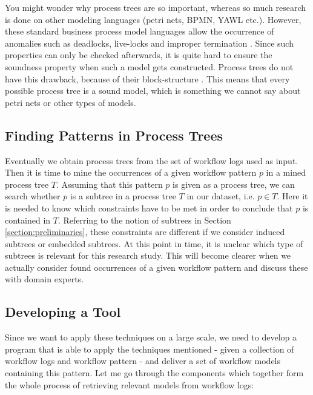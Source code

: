 \documentclass[a4paper,11pt]{article}
\begin{document}
You might wonder why process trees are so important, whereas so much research \cite{VanderAalst2003Survey} is done on other modeling languages (petri nets, BPMN, YAWL etc.). However, these standard business process model languages allow the occurrence of anomalies such as deadlocks, live-locks and improper termination \cite{Buijs2012ProcessTrees}. Since such properties can only be checked afterwards, it is quite hard to ensure the soundness property when such a model gets constructed. Process trees do not have this drawback, because of their block-structure \cite{2009DifferenceBetweenGraphAndBlockStructuredLanguages}. This means that every possible process tree is a sound model, which is something we cannot say about petri nets or other types of models.

\subsection{Finding Patterns in Process Trees}
\label{section:occurrences}
Eventually we obtain process trees from the set of workflow logs used as input. Then it is time to mine the occurrences of a given workflow pattern $p$ in a mined process tree $T$. Assuming that this pattern $p$ is given as a process tree, we can search whether $p$ is a subtree in a process tree $T$ in our dataset, i.e. $p \in T$. Here it is needed to know which constraints have to be met in order to conclude that $p$ is contained in $T$. Referring to the notion of subtrees in Section \ref{section:preliminaries}, these constraints are different if we consider induced subtrees or embedded subtrees. At this point in time, it is unclear which type of subtrees is relevant for this research study. This will become clearer when we actually consider found occurrences of a given workflow pattern and discuss these with domain experts.


\subsection{Developing a Tool}
Since we want to apply these techniques on a large scale, we need to develop a program that is able to apply the techniques mentioned - given a collection of workflow logs and workflow pattern - and deliver a set of workflow models containing this pattern. Let me go through the components which together form the whole process of retrieving relevant models from workflow logs:
\end{document}
